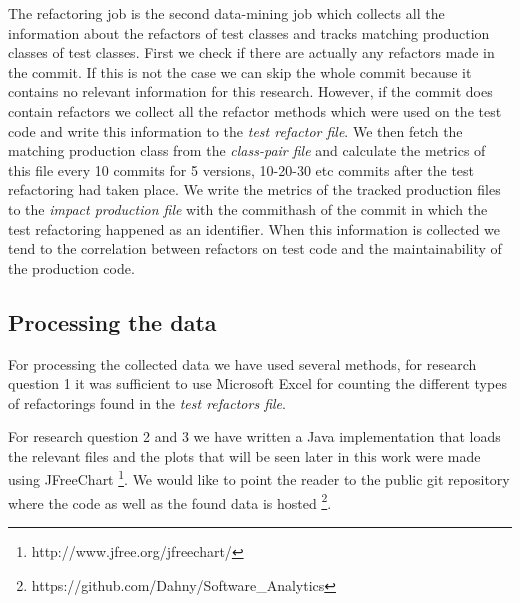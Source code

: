 The refactoring job is the second data-mining job which collects all the information about the refactors of test classes and tracks matching production classes of test classes. First we check if there are actually any refactors made in the commit. If this is not the case we can skip the whole commit because it contains no relevant information for this research. However, if the commit does contain refactors we collect all the refactor methods which were used on the test code and write this information to the \textit{test refactor file}. We then fetch the matching production class from the \textit{class-pair file} and calculate the metrics of this file every 10 commits for 5 versions, 10-20-30 etc commits after the test refactoring had taken place. We write the metrics of the tracked production files to the \textit{impact production file} with the commithash of the commit in which the test refactoring happened as an identifier. When this information is collected we tend to the correlation between refactors on test code and the maintainability of the production code. 

\subsection{Processing the data}
For processing the collected data we have used several methods, for research question 1 it was sufficient to use Microsoft Excel for counting the different types of refactorings found in the \textit{test refactors file}.

For research question 2 and 3 we have written a Java implementation that loads the relevant files and the plots that will be seen later in this work were made using JFreeChart \footnote{http://www.jfree.org/jfreechart/}. We would like to point the reader to the public git repository where the code as well as the found data is hosted \footnote{https://github.com/Dahny/Software\_Analytics}.